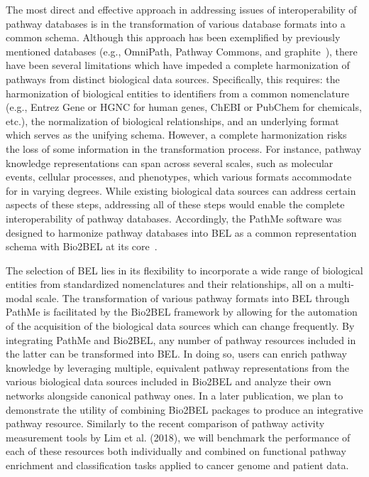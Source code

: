 The most direct and effective approach in addressing issues of interoperability of pathway databases is in the transformation of various database formats into a common schema.
Although this approach has been exemplified by previously mentioned databases (e.g., OmniPath, Pathway Commons, and graphite~\cite{Sales2019}), there have been several limitations which have impeded a complete harmonization of pathways from distinct biological data sources.
Specifically, this requires: the harmonization of biological entities to identifiers from a common nomenclature (e.g., Entrez Gene or HGNC for human genes, ChEBI or PubChem for chemicals, etc.), the normalization of biological relationships, and an underlying format which serves as the unifying schema.
However, a complete harmonization risks the loss of some information in the transformation process.
For instance, pathway knowledge representations can span across several scales, such as molecular events, cellular processes, and phenotypes, which various formats accommodate for in varying degrees.
While existing biological data sources can address certain aspects of these steps, addressing all of these steps would enable the complete interoperability of pathway databases.
Accordingly, the PathMe software was designed to harmonize pathway databases into BEL as a common representation schema with Bio2BEL at its core~\cite{Domingo-Fernandez2019}.

The selection of BEL lies in its flexibility to incorporate a wide range of biological entities from standardized nomenclatures and their relationships, all on a multi-modal scale.
The transformation of various pathway formats into BEL through PathMe is facilitated by the Bio2BEL framework by allowing for the automation of the acquisition of the biological data sources which can change frequently.
By integrating PathMe and Bio2BEL, any number of pathway resources included in the latter can be transformed into BEL\@.
In doing so, users can enrich pathway knowledge by leveraging multiple, equivalent pathway representations from the various biological data sources included in Bio2BEL and analyze their own networks alongside canonical pathway ones.
In a later publication, we plan to demonstrate the utility of combining Bio2BEL packages to produce an integrative pathway resource.
Similarly to the recent comparison of pathway activity measurement tools by Lim et al. (2018), we will benchmark the performance of each of these resources both individually and combined on functional pathway enrichment and classification tasks applied to cancer genome and patient data.

